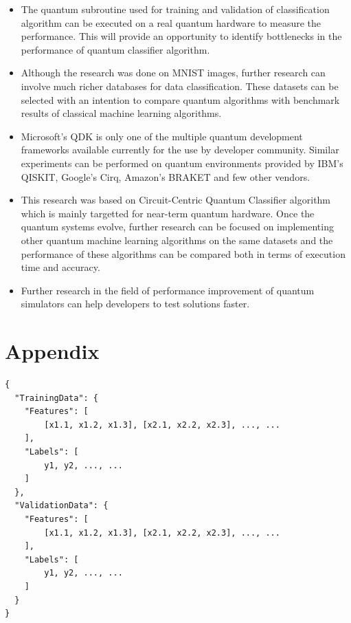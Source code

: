 \documentclass[english,a4paper,11pt,oneside,onecolumn]{book}
\begin{document}
\begin{itemize}
    \item The quantum subroutine used for training and validation of classification algorithm can be executed on a real quantum hardware to measure the performance. This will provide an opportunity to identify bottlenecks in the performance of quantum classifier algorithm.
    
    \item Although the research was done on MNIST images, further research can involve much richer databases for data classification. These datasets can be selected with an intention to compare quantum algorithms with benchmark results of classical machine learning algorithms.
    
    \item Microsoft's QDK is only one of the multiple quantum development frameworks available currently for the use by developer community. Similar experiments can be performed on quantum environments provided by IBM's QISKIT, Google's Cirq, Amazon's BRAKET and few other vendors.
    
    \item This research was based on Circuit-Centric Quantum Classifier \cite{schuld_2020_circuitcentric} algorithm which is mainly targetted for near-term quantum hardware. Once the quantum systems evolve, further research can be focused on implementing other quantum machine learning algorithms on the same datasets and the performance of these algorithms can be compared both in terms of execution time and accuracy.
    
    \item Further research in the field of performance improvement of quantum simulators can help developers to test solutions faster.
\end{itemize}

\nocite{}



\appendix
\chapter{Appendix}

\begin{lstlisting}[caption={Sample JSON Input file for Data Classification}]
{
  "TrainingData": {
    "Features": [
        [x1.1, x1.2, x1.3], [x2.1, x2.2, x2.3], ..., ...
    ],
    "Labels": [
        y1, y2, ..., ...
    ]
  },
  "ValidationData": {
    "Features": [
        [x1.1, x1.2, x1.3], [x2.1, x2.2, x2.3], ..., ...
    ],
    "Labels": [
        y1, y2, ..., ...
    ]
  }
}
\end{lstlisting}
\end{document}
